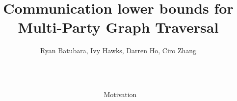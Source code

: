 \documentclass[final]{beamer}
\title{Communication lower bounds for Multi-Party Graph Traversal} %
\author{Ryan Batubara, Ivy Hawks, Darren Ho, Ciro Zhang} %
\institute{Mentor: Shachar Lovett, \textit{slovett@ucsd.edu}} %
\newlength{\sepwid}
\newlength{\onecolwid}
\begin{document}

\setlength{\belowcaptionskip}{2ex} %
\setlength\belowdisplayshortskip{2ex} %

\begin{frame}[t] %

\begin{columns}[t] %

\begin{column}{\sepwid}\end{column} %

\begin{column}{\onecolwid} %


\begin{block}{Motivation}

\begin{figure}[H]
\centering

\newcommand{\robot}[4]{
\begin{scope}[shift={(#1,#2)}, scale=#3]

\draw[rounded corners=3pt, fill=gray!20] (-1,1) rectangle (1,3);

\fill[#4] (-0.5,2.2) circle (0.15);
\fill[#4] (0.5,2.2) circle (0.15);

\draw[line width=0.8pt] (-0.4,1.6) -- (0.4,1.6);

\draw[line width=0.8pt] (0,3) -- (0,3.6);
\fill[#4] (0,3.6) circle (0.15);

\draw[rounded corners=5pt, fill=gray!10] (-1.5,-1) rectangle (1.5,1);

\fill[#4] (0,0.3) circle (0.15);
\fill[#4] (0,-0.2) circle (0.15);
\fill[#4] (0,-0.7) circle (0.15);

\draw[line width=0.8pt] (-1.5,0.5) -- (-2.2,0.5);
\draw[line width=0.8pt] (1.5,0.5) -- (2.2,0.5);


\end{scope}}
\end{figure}
\end{block}
\end{column}
\end{columns}
\end{frame}
\end{document}

